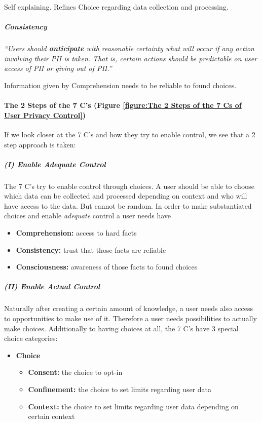 Self explaining. Refines Choice regarding data collection and
processing.

\subparagraph{Consistency}

\emph{``Users should \textbf{anticipate} with reasonable certainty what
will occur if any action involving their PII is taken. That is, certain
actions should be predictable on user access of PII or giving out of
PII.''}

Information given by Comprehension needs to be reliable to found
choices.

\paragraph{The 2 Steps of the 7 C's (Figure \ref{figure:The 2 Steps of the 7 Cs of User Privacy Control})}

If we look closer at the 7 C's and how they try to enable control, we
see that a 2 step approach is taken:



\subparagraph{(I) Enable \emph{Adequate} Control}

The 7 C's try to enable control through choices. A user should be able
to choose which data can be collected and processed depending on context
and who will have access to the data. But cannot be random. In order to
make substantiated choices and enable \emph{adequate} control a user
needs have

\begin{itemize}

\item
  \textbf{Comprehension:} access to hard facts
\item
  \textbf{Consistency:} trust that those facts are reliable
\item
  \textbf{Consciousness:} awareness of those facts to found choices
\end{itemize}

\subparagraph{(II) Enable \emph{Actual} Control}

Naturally after creating a certain amount of knowledge, a user needs
also access to opportunities to make use of it. Therefore a user needs
possibilities to actually make choices. Additionally to having choices at
all, the 7 C's have 3 special choice categories:

\begin{itemize}

\item
  \textbf{Choice}
  \begin{itemize}
  \item
    \textbf{Consent:} the choice to opt-in
  \item
    \textbf{Confinement:} the choice to set limits regarding user data
  \item
    \textbf{Context:} the choice to set limits regarding user data
    depending on certain context
  \end{itemize}

\end{itemize}

